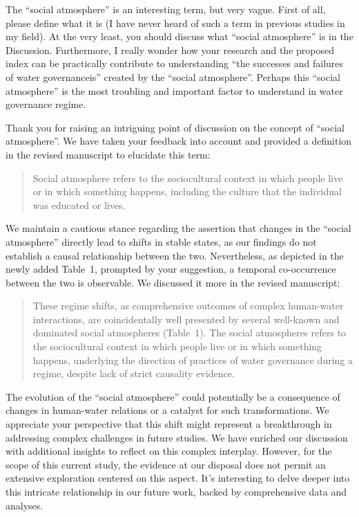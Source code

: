 \RC{} The ``social atmosphere'' is an interesting term, but very vague. First of all, please define what it is (I have never heard of such a term in previous studies in my field). At the very least, you should discuss what ``social atmosphere'' is in the Discussion. Furthermore, I really wonder how your research and the proposed index can be practically contribute to understanding ``the successes and failures of water governanceis'' created by the ``social atmosphere''. Perhaps this ``social atmosphere'' is the most troubling and important factor to understand in water governance regime.

\AR{} Thank you for raising an intriguing point of discussion on the concept of ``social atmosphere''. We have taken your feedback into account and provided a definition in the revised manuscript to elucidate this term:

\begin{quote}
    Social atmosphere refers to the sociocultural context in which people live or in which something happens, including the culture that the individual was educated or lives.
\end{quote}

\AR*{} We maintain a cautious stance regarding the assertion that changes in the ``social atmosphere'' directly lead to shifts in stable states, as our findings do not establish a causal relationship between the two. Nevertheless, as depicted in the newly added Table~1, prompted by your suggestion, a temporal co-occurrence between the two is observable. We discussed it more in the revised manuscript:

\begin{quote}
    These regime shifts, as comprehensive outcomes of complex human-water interactions, are coincidentally well presented by several well-known and dominated social atmospheres (Table~1).
    The social atmospheres refers to the sociocultural context in which people live or in which something happens, underlying the direction of practices of water governance during a regime, despite lack of strict causality evidence.
\end{quote}

\AR*{} The evolution of the ``social atmosphere'' could potentially be a consequence of changes in human-water relations or a catalyst for such transformations. We appreciate your perspective that this shift might represent a breakthrough in addressing complex challenges in future studies. We have enriched our discussion with additional insights to reflect on this complex interplay. However, for the scope of this current study, the evidence at our disposal does not permit an extensive exploration centered on this aspect. It's interesting to delve deeper into this intricate relationship in our future work, backed by comprehensive data and analyses.

